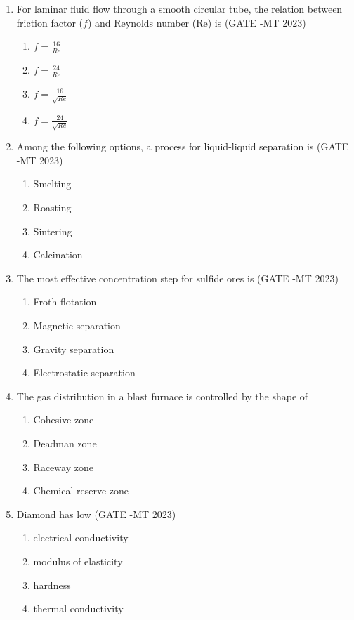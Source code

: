 \documentclass[12pt]{article}
\begin{document}
\begin{enumerate}
\item For laminar fluid flow through a smooth circular tube, the relation between friction factor (\(f\)) and Reynolds number (Re) is (GATE -MT 2023)
\begin{enumerate}[label=(\alph*)]
  \item \(f = \frac{16}{Re}\)
  \item \(f = \frac{24}{Re}\)
  \item \(f = \frac{16}{\sqrt{Re}}\)
  \item \(f = \frac{24}{\sqrt{Re}}\)
\end{enumerate}

\item Among the following options, a process for liquid-liquid separation is (GATE -MT 2023)
\begin{enumerate}[label=(\alph*)]
  \item Smelting
  \item Roasting
  \item Sintering
  \item Calcination
\end{enumerate}

\item The most effective concentration step for sulfide ores is (GATE -MT 2023)
\begin{enumerate}[label=(\alph*)]
  \item Froth flotation
  \item Magnetic separation
  \item Gravity separation
  \item Electrostatic separation
\end{enumerate}

\item The gas distribution in a blast furnace is controlled by the shape of
\begin{enumerate}[label=(\alph*)] (GATE -MT 2023)
  \item Cohesive zone
  \item Deadman zone
  \item Raceway zone
  \item Chemical reserve zone
\end{enumerate}

\item Diamond has low  (GATE -MT 2023)
\begin{enumerate}[label=(\alph*)]
  \item electrical conductivity
  \item modulus of elasticity
  \item hardness
  \item thermal conductivity
\end{enumerate}


\end{enumerate}
\end{document}
